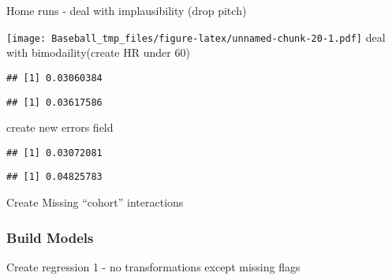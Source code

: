 \documentclass[
]{article}
\begin{document}
Home runs - deal with implausibility (drop pitch)

\texttt{[image: Baseball\_tmp\_files/figure-latex/unnamed-chunk-20-1.pdf]}
deal with bimodaility(create HR under 60)

\begin{verbatim}
## [1] 0.03060384
\end{verbatim}

\begin{verbatim}
## [1] 0.03617586
\end{verbatim}

create new errors field

\begin{verbatim}
## [1] 0.03072081
\end{verbatim}

\begin{verbatim}
## [1] 0.04825783
\end{verbatim}

Create Missing ``cohort'' interactions

\hypertarget{build-models}{%
\subsubsection{Build Models}\label{build-models}}

Create regression 1 - no transformations except missing flags
\end{document}
